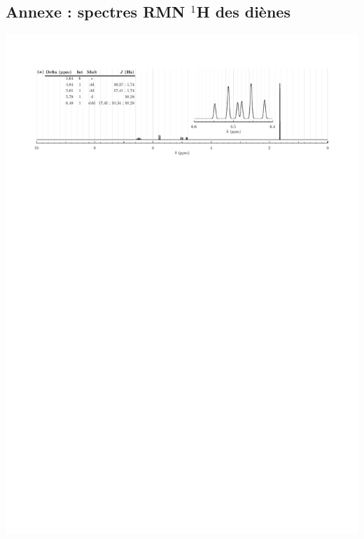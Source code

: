 \cleardoublepage

\subsection*{Annexe : spectres RMN $^{1}$H des diènes}

\begin{center}
    \includegraphics[width=.95\linewidth]{chimiePC/orga/RMN_4met.pdf}

\end{center}

